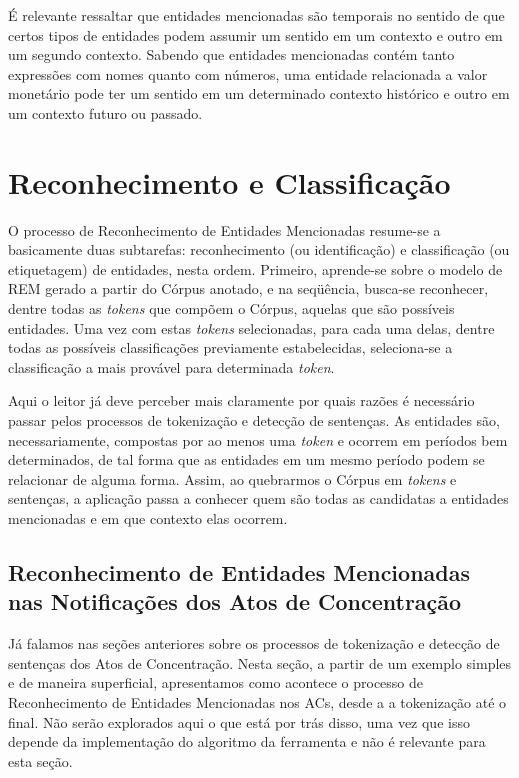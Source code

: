 \documentclass[11pt]{report}
\begin{document}
É relevante ressaltar que entidades mencionadas são temporais no sentido de que certos tipos de entidades podem assumir um sentido em um contexto e outro em um segundo contexto.
Sabendo que entidades mencionadas contém tanto expressões com nomes quanto com números, uma entidade relacionada a valor monetário pode ter um sentido em um determinado
contexto histórico e outro em um contexto futuro ou passado.

\section{Reconhecimento e Classificação}

\indent\indent O processo de Reconhecimento de Entidades Mencionadas resume-se a basicamente duas subtarefas: reconhecimento (ou identificação) e classificação (ou etiquetagem)
de entidades, nesta ordem. Primeiro, aprende-se sobre o modelo de REM gerado a partir do Córpus anotado, e na seqüência, busca-se reconhecer, dentre todas as \textit{tokens}
que compõem o Córpus, aquelas que são possíveis entidades. Uma vez com estas \textit{tokens} selecionadas, para cada uma delas, dentre todas as possíveis classificações
previamente estabelecidas, seleciona-se a classificação a mais provável para determinada \textit{token}.

Aqui o leitor já deve perceber mais claramente por quais razões é necessário passar pelos processos de tokenização e detecção de sentenças. As entidades são, necessariamente,
compostas por ao menos uma \textit{token} e ocorrem em períodos bem determinados, de tal forma que as entidades em um mesmo período podem se relacionar de alguma forma. Assim,
ao quebrarmos o Córpus em \textit{tokens} e sentenças, a aplicação passa a conhecer quem são todas as candidatas a entidades mencionadas e em que contexto elas ocorrem.

\subsection{Reconhecimento de Entidades Mencionadas nas Notificações dos Atos de Concentração}

\indent\indent Já falamos nas seções anteriores sobre os processos de tokenização e detecção de sentenças dos Atos de Concentração. Nesta seção, a partir de um exemplo simples e
de maneira superficial, apresentamos como acontece o processo de Reconhecimento de Entidades Mencionadas nos ACs, desde a a tokenização até o final. Não serão explorados aqui
o que está por trás disso, uma vez que isso depende da implementação do algoritmo da ferramenta e não é relevante para esta seção.
\end{document}
